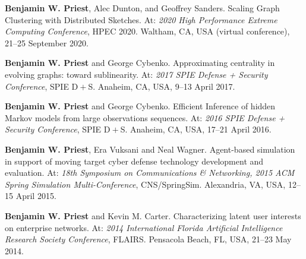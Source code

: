 \item \textbf{Benjamin W. Priest}, Alec Dunton, and Geoffrey Sanders.
        Scaling Graph Clustering with Distributed Sketches.
        At: \emph{2020 High Performance Extreme Computing Conference},
        HPEC 2020.
	Waltham, CA, USA (virtual conference),
        21--25 September 2020.

\item \textbf{Benjamin W. Priest} and George Cybenko.
	Approximating centrality in evolving graphs: toward sublinearity.
	At: \emph{2017 SPIE Defense + Security Conference}, 
	SPIE D$\! + \!$S. 
	Anaheim, CA, USA,
        9--13 April 2017.

\item \textbf{Benjamin W. Priest} and George Cybenko.
	Efficient Inference of hidden Markov models from large observations sequences.
	At: \emph{2016 SPIE Defense + Security Conference}, 
	SPIE D$\! + \!$S. 
	Anaheim, CA, USA,
        17--21 April 2016.

\item \textbf{Benjamin W. Priest}, Era Vuksani and Neal Wagner.
	Agent-based simulation in support of moving target cyber defense technology development and evaluation.
	At: \emph{18th Symposium on Communications \& Networking, 2015 ACM Spring Simulation Multi-Conference}, 
	CNS/SpringSim. 
	Alexandria, VA, USA,
        12--15 April 2015.

\item \textbf{Benjamin W. Priest} and Kevin M. Carter.
	Characterizing latent user interests on enterprise networks.
	At: \emph{2014 International Florida Artificial Intelligence Research Society Conference},
	FLAIRS.
	Pensacola Beach, FL, USA,
	21--23 May 2014.
